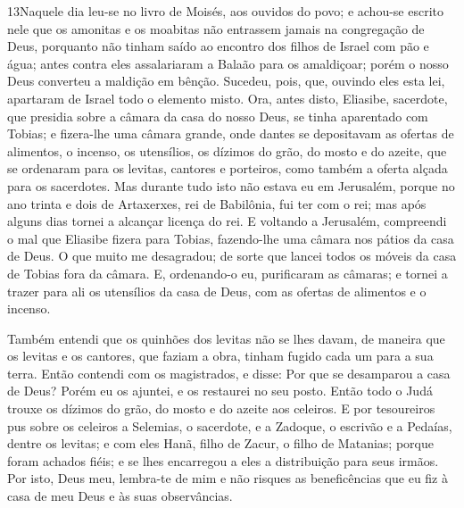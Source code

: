 \medskip

\lettrine{13} Naquele dia leu-se no livro de Moisés, aos
ouvidos do povo; e achou-se escrito nele que os amonitas e os
moabitas não entrassem jamais na congregação de Deus, porquanto
não tinham saído ao encontro dos filhos de Israel com pão e água;
antes contra eles assalariaram a Balaão para os amaldiçoar; porém o
nosso Deus converteu a maldição em bênção. Sucedeu, pois, que,
ouvindo eles esta lei, apartaram de Israel todo o elemento misto.
Ora, antes disto, Eliasibe, sacerdote, que presidia sobre a
câmara da casa do nosso Deus, se tinha aparentado com Tobias; e
fizera-lhe uma câmara grande, onde dantes se depositavam as ofertas
de alimentos, o incenso, os utensílios, os dízimos do grão, do mosto
e do azeite, que se ordenaram para os levitas, cantores e porteiros,
como também a oferta alçada para os sacerdotes. Mas durante tudo
isto não estava eu em Jerusalém, porque no ano trinta e dois de
Artaxerxes, rei de Babilônia, fui ter com o rei; mas após alguns
dias tornei a alcançar licença do rei. E voltando a Jerusalém,
compreendi o mal que Eliasibe fizera para Tobias, fazendo-lhe uma
câmara nos pátios da casa de Deus. O que muito me desagradou; de
sorte que lancei todos os móveis da casa de Tobias fora da câmara.
E, ordenando-o eu, purificaram as câmaras; e tornei a trazer
para ali os utensílios da casa de Deus, com as ofertas de alimentos
e o incenso.

Também entendi que os quinhões dos levitas não se lhes davam, de
maneira que os levitas e os cantores, que faziam a obra, tinham
fugido cada um para a sua terra. Então contendi com os
magistrados, e disse: Por que se desamparou a casa de Deus? Porém eu
os ajuntei, e os restaurei no seu posto. Então todo o Judá
trouxe os dízimos do grão, do mosto e do azeite aos celeiros.
E por tesoureiros pus sobre os celeiros a Selemias, o
sacerdote, e a Zadoque, o escrivão e a Pedaías, dentre os levitas; e
com eles Hanã, filho de Zacur, o filho de Matanias; porque foram
achados fiéis; e se lhes encarregou a eles a distribuição para seus
irmãos. Por isto, Deus meu, lembra-te de mim e não risques as
beneficências que eu fiz à casa de meu Deus e às suas observâncias.

